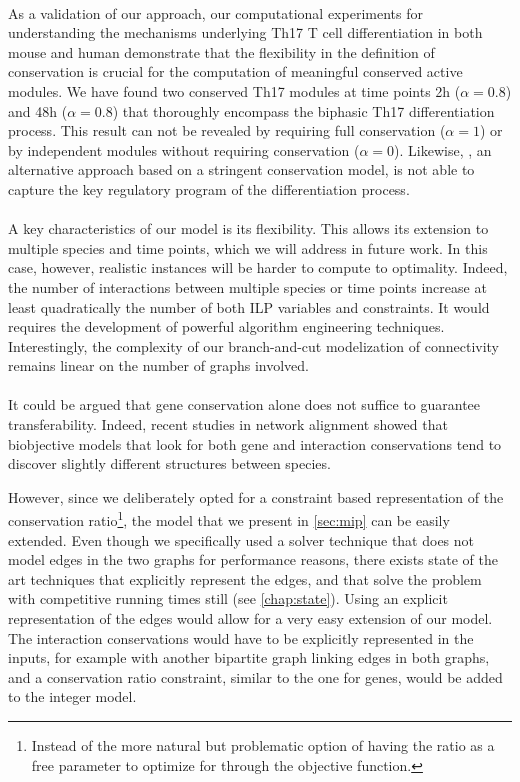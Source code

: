 \paragraph{}
As a validation of our approach, our computational experiments for understanding the mechanisms underlying Th17 T cell differentiation in both mouse and human demonstrate that the flexibility in the definition of conservation is crucial for the computation of meaningful conserved active modules.
We have found two conserved Th17 modules at time points \unit{2}{h} ($\alpha = 0.8$) and \unit{48}{h} ($\alpha=0.8$) that thoroughly encompass the biphasic Th17 differentiation process.
This result can not be revealed by requiring full conservation ($\alpha = 1$) or by independent modules without requiring conservation ($\alpha = 0$).
Likewise, \nexus, an alternative approach based on a stringent conservation model, is not able to capture the key regulatory program of the differentiation process.

\paragraph{}
A key characteristics of our model is its flexibility.
This allows its extension to multiple species and time points, which we will address in future work.
In this case, however, realistic instances will be harder to compute to optimality.
Indeed, the number of interactions between multiple species or time points increase at least quadratically the number of both ILP variables and constraints.
It would requires the development of powerful algorithm engineering techniques.
Interestingly, the complexity of our branch-and-cut modelization of connectivity remains linear on the number of graphs involved.

\paragraph{}
It could be argued that gene conservation alone does not suffice to guarantee transferability.
Indeed, recent studies in network alignment showed that biobjective models that look for both gene and interaction conservations tend to discover slightly different structures between species.

However, since we deliberately opted for a constraint based representation of the conservation ratio\footnote{Instead of the more natural but problematic option of having the ratio as a free parameter to optimize for through the objective function.}, the model that we present in \ref{sec:mip} can be easily extended.
Even though we specifically used a solver technique that does not model edges in the two graphs for performance reasons, there exists state of the art techniques that explicitly represent the edges, and that solve the \mwcs{} problem with competitive running times still (see \cref{chap:state}).
Using an explicit representation of the edges would allow for a very easy extension of our model.
The interaction conservations would have to be explicitly represented in the inputs, for example with another bipartite graph linking edges in both graphs, and a conservation ratio constraint, similar to the one for genes, would be added to the integer model.

